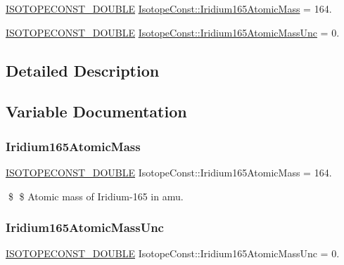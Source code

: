 \begin{DoxyCompactItemize}
\item 
\mbox{\hyperlink{group___isotope_const-_macros_ga8f45a7272ce02c0b4c65c44636ed719a}{I\+S\+O\+T\+O\+P\+E\+C\+O\+N\+S\+T\+\_\+\+D\+O\+U\+B\+LE}} \mbox{\hyperlink{group___isotope_const-_iridium-_ir165_gab208ed0116379b751c48d31b3021bb96}{Isotope\+Const\+::\+Iridium165\+Atomic\+Mass}} = 164.
\item 
\mbox{\hyperlink{group___isotope_const-_macros_ga8f45a7272ce02c0b4c65c44636ed719a}{I\+S\+O\+T\+O\+P\+E\+C\+O\+N\+S\+T\+\_\+\+D\+O\+U\+B\+LE}} \mbox{\hyperlink{group___isotope_const-_iridium-_ir165_gac621fdee352b00898bf1b3e567cd1d6c}{Isotope\+Const\+::\+Iridium165\+Atomic\+Mass\+Unc}} = 0.
\end{DoxyCompactItemize}


\subsection{Detailed Description}


\subsection{Variable Documentation}
\mbox{\label{group___isotope_const-_iridium-_ir165_gab208ed0116379b751c48d31b3021bb96}} 
\subsubsection{\texorpdfstring{Iridium165\+Atomic\+Mass}{Iridium165AtomicMass}}
{\footnotesize\ttfamily \mbox{\hyperlink{group___isotope_const-_macros_ga8f45a7272ce02c0b4c65c44636ed719a}{I\+S\+O\+T\+O\+P\+E\+C\+O\+N\+S\+T\+\_\+\+D\+O\+U\+B\+LE}} Isotope\+Const\+::\+Iridium165\+Atomic\+Mass = 164.}

\$ \$ Atomic mass of Iridium-\/165 in amu. \mbox{\label{group___isotope_const-_iridium-_ir165_gac621fdee352b00898bf1b3e567cd1d6c}} 
\subsubsection{\texorpdfstring{Iridium165\+Atomic\+Mass\+Unc}{Iridium165AtomicMassUnc}}
{\footnotesize\ttfamily \mbox{\hyperlink{group___isotope_const-_macros_ga8f45a7272ce02c0b4c65c44636ed719a}{I\+S\+O\+T\+O\+P\+E\+C\+O\+N\+S\+T\+\_\+\+D\+O\+U\+B\+LE}} Isotope\+Const\+::\+Iridium165\+Atomic\+Mass\+Unc = 0.}

